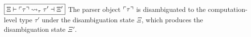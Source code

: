 \noindent $ \boxed{\Xi \vdash \ulcorner\tau\urcorner \rightsquigarrow_\tau \tau' \dashv \Xi'} $ \quad The parser object $ \ulcorner\tau\urcorner $ is disambiguated to the computation-level type $ \tau' $ under the disambiguation state $ \Xi $, which produces the disambiguation state $ \Xi' $.
